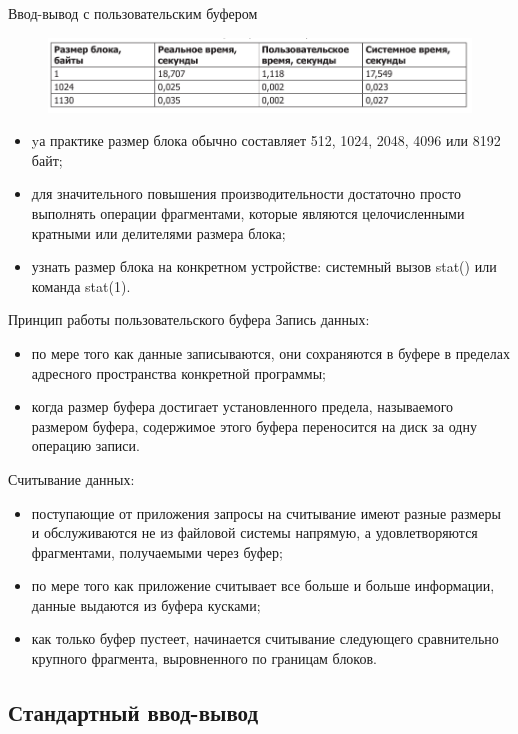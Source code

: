 \documentclass{beamer}
\begin{document}
\begin{frame}{Ввод-вывод с пользовательским буфером}
\begin{figure}[h]
\centering
\includegraphics[scale=0.5]{images/lec05-pic03.png}
\end{figure}
\begin{itemize}
\item yа практике размер блока обычно составляет 512, 1024, 2048, 4096 или 8192 байт;
\item для значительного повышения производительности достаточно просто выполнять операции фрагментами, которые являются целочисленными кратными или делителями размера блока;
\item узнать размер блока на конкретном устройстве: системный вызов stat() или  команда stat(1).  
\end{itemize}
\end{frame}

\begin{frame}{Принцип работы пользовательского буфера}
Запись данных:
\begin{itemize}
\item по мере того как данные записываются, они сохраняются в буфере в пределах адресного пространства конкретной программы;
\item когда размер буфера достигает установленного предела, называемого размером буфера, содержимое этого буфера переносится на диск за одну операцию записи. 
\end{itemize}
Считывание данных:
\begin{itemize}
\item поступающие от приложения запросы на считывание имеют разные размеры и обслуживаются не из файловой системы напрямую, а удовлетворяются фрагментами,
получаемыми через буфер;
\item по мере того как приложение считывает все больше и больше информации, данные выдаются из буфера кусками;
\item как только буфер пустеет, начинается считывание следующего сравнительно крупного фрагмента, выровненного по границам блоков. 
\end{itemize}
\end{frame}

\subsection{Стандартный ввод-вывод}
\end{document}
